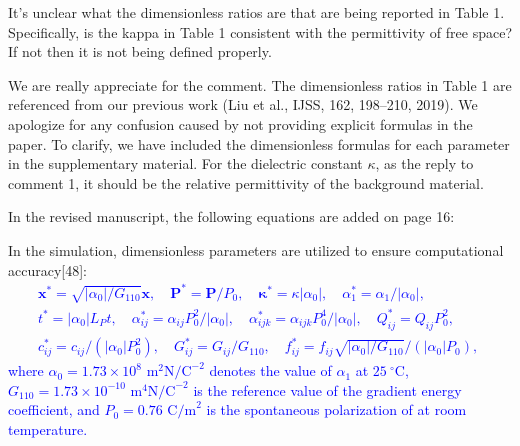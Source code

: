 \documentclass[12pt,fleqn]{article}
\begin{document}
\begin{question}{}\label{R1:Q8}
It's unclear what the dimensionless ratios are that are being reported in Table 1. Specifically, is the kappa in Table 1 consistent with the permittivity of free space? If not then it is not being defined properly.
\end{question}
\begin{response}
We are really appreciate for the comment. The dimensionless ratios in Table 1 are referenced from our previous work (Liu et al., IJSS, 162, 198–210, 2019). We apologize for any confusion caused by not providing explicit formulas in the paper. To clarify, we have included the dimensionless formulas for each parameter in the supplementary material. For the dielectric constant $\kappa$, as the reply to comment 1, it should be the relative permittivity of the background material.

In the revised manuscript, the following equations are added on page 16:
\begin{revised}
In the simulation, dimensionless parameters are utilized to ensure computational accuracy[48]:
\setcounter{equation}{47}
\textcolor{blue}{
\begin{equation}
    \begin{split}
        & \mathbf{x}^*=\sqrt{|\alpha_0|/G_{110}}\mathbf{x}, \quad
        \mathbf{P}^*=\mathbf{P}/{P_0}, \quad
        \mathbf{\kappa^*}=\kappa |\alpha_0|, \quad
        \alpha_1^*=\alpha_1/|\alpha_0|, \quad \\
        & t^*=|\alpha_0 | L_P t, \quad
         \alpha_{ij}^*=\alpha_{ij}P_0^2/|\alpha_0|, \quad
        \alpha_{ijk}^*=\alpha_{ijk}P_0^4/|\alpha_0|, \quad
        Q_{ij}^*=Q_{ij}P_0^2, \quad \\
       &c_{ij}^*=c_{ij}/(|\alpha_0|P_0^2),\quad
        G_{ij}^*=G_{ij}/G_{110}, \quad
       f_{ij}^*=f_{ij}\sqrt{|\alpha_0|/G_{110}}/(|\alpha_0| P_0), \quad
    \end{split}
\end{equation}
where $\alpha_0=1.73\times 10^8$ $\text{m}^2 \text{N/C}^{-2}$ denotes the value of $\alpha_1$ at $25 ~^\circ $C, $G_{110}= 1.73\times 10^{-10}$ $\text{m}^4 \text{N/C}^{-2}$ is the reference value of the gradient energy coefficient, and $P_0=0.76$ $\text{C/m}^{2}$  is the spontaneous polarization of  at room temperature.}
\end{revised}
\end{response}
\end{document}
